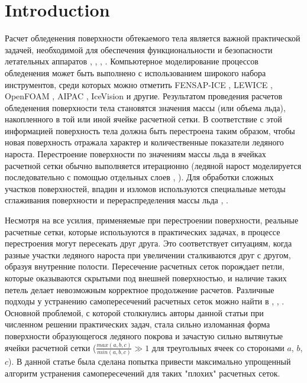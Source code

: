 \documentclass[
11pt,%
tightenlines,%
twoside,%
onecolumn,%
nofloats,%
nobibnotes,%
nofootinbib,%
superscriptaddress,%
noshowpacs,%
centertags]%
{revtex4}
\begin{document}
\maketitle

\section{Introduction}

Расчет обледенения поверхности обтекаемого тела является важной практической задачей, необходимой для обеспечения функциональности и безопасности летательных аппаратов \cite{Myers}, \cite{Farzaneh}, \cite{Dong}, \cite{Beaugendre}.
Компьютерное моделирование процессов обледенения может быть выполнено с использованием широкого набора инструментов, среди которых можно отметить FENSAP-ICE \cite{Bourgault}, LEWICE \cite{Wright}, OpenFOAM \cite{Beld}, AIPAC \cite{Domingos}, IceVision \cite{Aksenov} и другие.
Результатом проведения расчетов обледенения поверхности тела становятся значения массы (или объема льда), накопленного в той или иной ячейке расчетной сетки.
В соответствие с этой информацией поверхность тела должна быть перестроена таким образом, чтобы новая поверхность отражала характер и количественные показатели ледяного нароста.
Перестроение поверхности по значениям массы льда в ячейках расчетной сетки обычно выполняется итерационно (ледяной нарост моделируется последовательно с помощью отдельных слоев \cite{BourgaultCote}, \cite{Fortin}).
Для обработки сложных участков поверхностей, впадин и изломов используются специальные методы сглаживания поверхности и перераспределения массы льда \cite{Thompson}, \cite{Tong}.

Несмотря на все усилия, применяемые при перестроении поверхности, реальные расчетные сетки, которые используются в практических задачах, в процессе перестроения могут пересекать друг друга.
Это соответствует ситуациям, когда разные участки ледяного нароста при увеличении сталкиваются друг с другом, образуя внутренние полости.
Пересечение расчетных сеток порождает петли, которые оказываются скрытыми под внешней поверхностью, и наличие таких петель делает невозможным корректное продолжение расчетов.
Различные подходы у устранению самопересечений расчетных сеток можно найти в \cite{Charton}, \cite{Jung}, \cite{Skorkovska}.
Основной проблемой, с которой столкнулись авторы данной статьи при численном решении практических задач, стала сильно изломанная форма поверхности образующегося ледяного покрова и зачастую сильно вытянутые ячейки расчетной сетки ($\frac{max(a, b, c)}{min(a, b, c)} \gg 1$ для треугольных ячеек со сторонами $a$, $b$, $c$).
В данной статье была сделана попытка привести максимально упрощенный алгоритм устранения самопересечений для таких "плохих" расчетных сеток.
\end{document}
